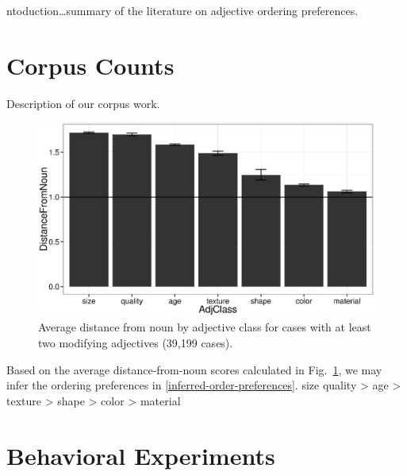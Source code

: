 \documentclass{pnastwo}
\begin{document}
\begin{article}
\begin{abstract}
{Abstract here\ldots}
\end{abstract}



ntoduction\ldots summary of the literature on adjective ordering preferences.


\section{Corpus Counts}

Description of our corpus work.

\begin{figure}[h]
	\centering
	\includegraphics[width=.95\linewidth]{plots/distance_from_noun.eps}
	\caption{Average distance from noun by adjective class for cases with at least two modifying adjectives (39,199 cases).}\label{distance-from-noun}
\end{figure}

Based on the average distance-from-noun scores calculated in Fig.\ \ref{distance-from-noun}, we may infer the ordering preferences in \ref{inferred-order-preferences}.
\be size \geq quality > age > texture > shape > color > material \label{inferred-order-preferences}\ee

\section{Behavioral Experiments}
	

\end{article}
\end{document}
